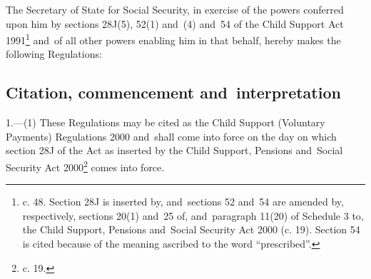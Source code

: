 \documentclass[12pt,a4paper]{article}
\title{\regstitle}
\author{S.I. 2000 No. 3177}
\date{Made 30th November 2000\\Laid before Parliament 6th December 2000\\Coming into force as provided in regulation~1(1)}
\begin{document}
\maketitle


\medskip

\noindent
The Secretary of State for Social Security, in exercise of the powers conferred upon him by sections 28J(5), 52(1) and~(4) and~54 of the Child Support Act 1991\footnote{ c. 48. Section 28J is inserted by, and~sections 52 and~54 are amended by, respectively, sections 20(1) and~25 of, and~paragraph 11(20) of Schedule 3 to, the Child Support, Pensions and~Social Security Act 2000 (c. 19). Section 54 is cited because of the meaning ascribed to the word “prescribed”.} and~of all other powers enabling him in that behalf, hereby makes the following Regulations: 

{\sloppy

\tableofcontents

}

\bigskip

\setcounter{secnumdepth}{-2}

\subsection[1. Citation, commencement and~interpretation]{Citation, commencement and~interpretation}

1.---(1)  These Regulations may be cited as the Child Support (Voluntary Payments) Regulations 2000 and~shall come into force on the day on which section 28J of the Act as inserted by the Child Support, Pensions and~Social Security Act 2000\footnote{ c. 19.} comes into force.
\end{document}
